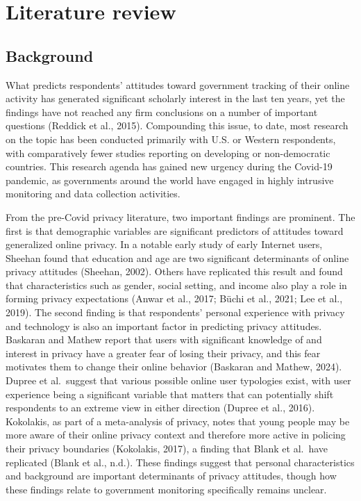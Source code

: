 \documentclass[
  letterpaper,
  DIV=11,
  numbers=noendperiod]{scrartcl}
\begin{document}
\section{Literature review}\label{sec-litreview}

\subsection{Background}\label{background}

What predicts respondents' attitudes toward government tracking of their
online activity has generated significant scholarly interest in the last
ten years, yet the findings have not reached any firm conclusions on a
number of important questions (Reddick et al., 2015). Compounding this
issue, to date, most research on the topic has been conducted primarily
with U.S. or Western respondents, with comparatively fewer studies
reporting on developing or non-democratic countries. This research
agenda has gained new urgency during the Covid-19 pandemic, as
governments around the world have engaged in highly intrusive monitoring
and data collection activities.

From the pre-Covid privacy literature, two important findings are
prominent. The first is that demographic variables are significant
predictors of attitudes toward generalized online privacy. In a notable
early study of early Internet users, Sheehan found that education and
age are two significant determinants of online privacy attitudes
(Sheehan, 2002). Others have replicated this result and found that
characteristics such as gender, social setting, and income also play a
role in forming privacy expectations (Anwar et al., 2017; Büchi et al.,
2021; Lee et al., 2019). The second finding is that respondents'
personal experience with privacy and technology is also an important
factor in predicting privacy attitudes. Baskaran and Mathew report that
users with significant knowledge of and interest in privacy have a
greater fear of losing their privacy, and this fear motivates them to
change their online behavior (Baskaran and Mathew, 2024). Dupree et
al.~suggest that various possible online user typologies exist, with
user experience being a significant variable that matters that can
potentially shift respondents to an extreme view in either direction
(Dupree et al., 2016). Kokolakis, as part of a meta-analysis of privacy,
notes that young people may be more aware of their online privacy
context and therefore more active in policing their privacy boundaries
(Kokolakis, 2017), a finding that Blank et al.~have replicated (Blank et
al., n.d.). These findings suggest that personal characteristics and
background are important determinants of privacy attitudes, though how
these findings relate to government monitoring specifically remains
unclear.
\end{document}
